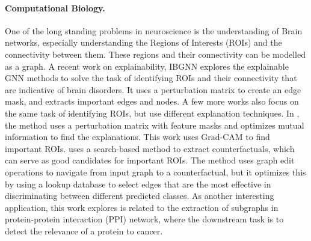 \paragraph{Computational Biology.} 
One of the long standing problems in neuroscience is the understanding of Brain networks, especially understanding the Regions of Interests (ROIs) and the connectivity between them. These regions and their connectivity can be modelled as a graph. A recent work on explainability, IBGNN \cite{cui2022interpretable} explores the explainable GNN methods to solve the task of identifying ROIs and their connectivity that are indicative of brain disorders. It uses a perturbation matrix to create an edge mask, and extracts important edges and nodes. A few more works also focus on the same task of identifying ROIs, but use different explanation techniques. In \cite{mauri2022accurate}, the method uses a perturbation matrix with feature masks and optimizes mutual information to find the explanations. This work \cite{zhou2022interpretable} uses Grad-CAM \cite{Excitation-BP} to find important ROIs. \cite{abrate2021counterfactual} uses a search-based method to extract counterfactuals, which can serve as good candidates for important ROIs. The method uses graph edit operations to navigate from input graph to a counterfactual, but it optimizes this by using a lookup database to select edges that are the most effective in discriminating between different predicted classes. As another interesting application, this work \cite{pfeifer2022gnn} explores is related to the extraction of subgraphs in protein-protein interaction (PPI) network, where the downstream task is to detect the relevance of a protein to cancer. 






